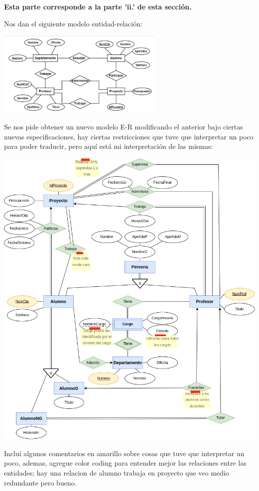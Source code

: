 \begin{center}
    \textbf{Esta parte corresponde a la parte 'ii.' de esta sección.}
\end{center}

\vspace{.3cm}

Nos dan el siguiente modelo entidad-relación:\\

\begin{center}
    \includegraphics[width=8cm]{resources/ER_2.2.5.png}
\end{center}

Se nos pide obtener un nuevo modelo E-R modificando el anterior bajo ciertas nuevas
especificaciones, hay ciertas restricciones que tuve que interpretar un poco para 
poder traducir, pero aquí está mi interpretación de las mismas:\\
\begin{center}
    \includegraphics[width=14cm]{resources/Ejercicio_2.5.png}
\end{center}

Incluí algunos comentarios en amarillo sobre cosas que tuve que interpretar un poco,
ademas, agregue color coding para entender mejor las relaciones entre las entidades;
hay una relacion de alumno trabaja en proyecto que veo medio redundante pero bueno.\\